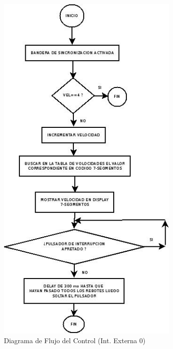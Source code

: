 \documentclass[a4paper,10pt]{article}
\begin{document}
					\newpage
					\begin{figure}[!htb]
						\centering
						\includegraphics[width=9cm]{Imagenes/DiagFlujoControl3.jpg}
						\caption{Diagrama de Flujo del Control (Int. Externa 0)} \label{ControlFlujo2}
					\end{figure}
			
\end{document}

